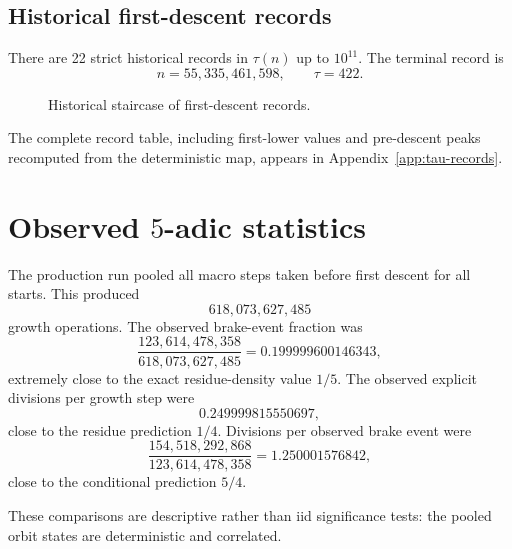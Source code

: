 \documentclass[11pt]{article}
\theoremstyle{definition}
\begin{document}
\subsection{Historical first-descent records}

There are 22 strict historical records in $\tau(n)$ up to $10^{11}$. The terminal record is
\[
n=55{,}335{,}461{,}598,\qquad \tau=422.
\]

\begin{figure}[H]
\centering
{}
\caption{Historical staircase of first-descent records.}
\end{figure}

The complete record table, including first-lower values and pre-descent peaks recomputed from the deterministic map, appears in Appendix~\ref{app:tau-records}.

\section{Observed $5$-adic statistics}

The production run pooled all macro steps taken before first descent for all starts. This produced
\[
618{,}073{,}627{,}485
\]
growth operations. The observed brake-event fraction was
\[
\frac{123{,}614{,}478{,}358}{618{,}073{,}627{,}485}
=0.199999600146343,
\]
extremely close to the exact residue-density value $1/5$. The observed explicit divisions per growth step were
\[
0.249999815550697,
\]
close to the residue prediction $1/4$. Divisions per observed brake event were
\[
\frac{154{,}518{,}292{,}868}{123{,}614{,}478{,}358}
=1.250001576842,
\]
close to the conditional prediction $5/4$.

These comparisons are descriptive rather than iid significance tests: the pooled orbit states are deterministic and correlated.
\end{document}

